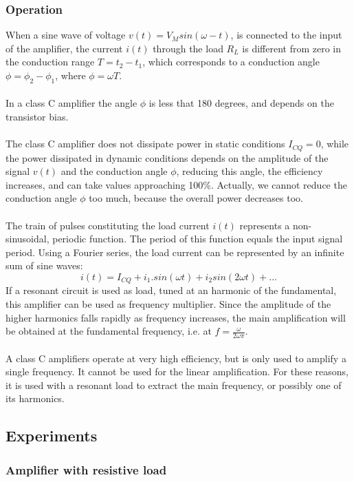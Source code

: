 \documentclass[12pt,a4paper]{article}
\begin{document}
    \subsubsection{Operation}
    When a sine wave of voltage $v(t) = V_M sin(\omega-t)$, is connected to the input of the amplifier, the current $i(t)$ through the load $R_L$ is different from zero in the conduction range $T = t_2 - t_1$, which corresponds to a conduction angle $\phi = \phi_2 - \phi_1$, where $\phi = \omega T$.
    \\
    \\
    In a class C amplifier the angle $\phi$ is less that 180 degrees, and depends on the transistor bias.
    \\
    \\
    The class C amplifier does not dissipate power in static conditions $I_{CQ} = 0$, while the power dissipated in dynamic conditions depends on the amplitude of the signal $v(t)$ and the conduction angle $\phi$, reducing this angle, the efficiency increases, and can take values approaching 100\%. Actually, we cannot reduce the conduction angle $\phi$ too much, because the overall power decreases too.
    \\
    \\
    The train of pulses constituting the load current $i(t)$ represents a non-sinusoidal, periodic function. The period of this function equals the input signal period. Using a Fourier series, the load current can be represented by an infinite sum of sine waves:
    $$i(t) = I_{CQ} + i_{1}.sin(\omega t) + i_{2}sin(2 \omega t) +...$$
    If a resonant circuit is used as load, tuned at an harmonic of the fundamental, this amplifier can be used as frequency multiplier. Since the amplitude of the higher harmonics falls rapidly as frequency increases, the main amplification will be obtained at the fundamental frequency, i.e. at $f = \frac{\omega}{2 \omega \pi}$.
    \\
    \\
    A class C amplifiers operate at very high efficiency, but is only used to amplify a single frequency. It cannot be used for the linear amplification. For these reasons, it is used with a resonant load to extract the main frequency, or possibly one of its harmonics.
    \subsection{Experiments}
    \subsubsection{Amplifier with resistive load}
\end{document}
